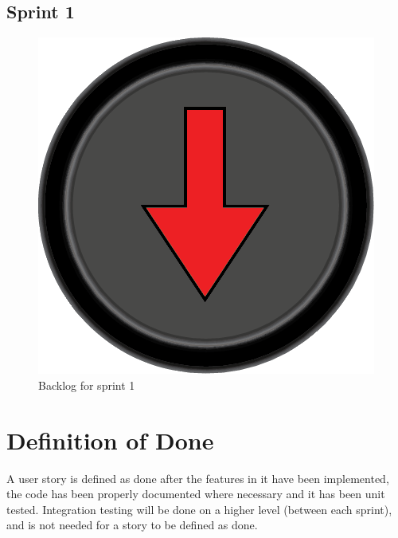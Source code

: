 \documentclass[a4paper,12pt]{article}
\begin{document}
\subsection{Sprint 1}
\begin{figure}[h]
	\centering
	\includegraphics[width=\textwidth]{src/main/resources/image/arrow_down}
	\caption{Backlog for sprint 1}
\end{figure}

\section{Definition of Done}
A user story is defined as done after the features in it have been implemented,
the code has been properly documented where necessary and it has been
unit tested. Integration testing will be done on a higher level (between each
sprint), and is not needed for a story to be defined as done.
\end{document}
